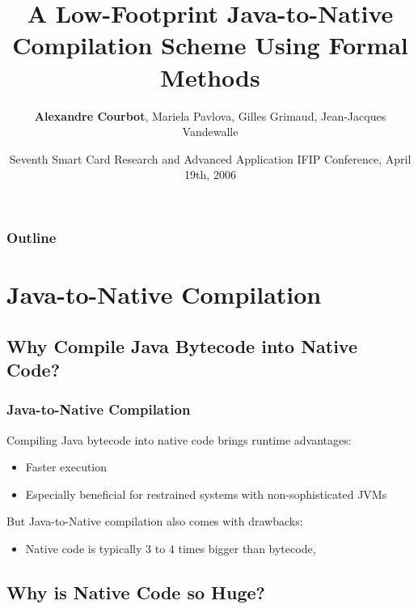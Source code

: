 \documentclass{beamer}
\title[CARDIS'06]{A Low-Footprint Java-to-Native Compilation Scheme Using Formal Methods}
\author[Alexandre.Courbot@lifl.fr]{\textbf{Alexandre Courbot}, Mariela Pavlova, Gilles Grimaud, Jean-Jacques Vandewalle}
\date[CARDIS'06]{Seventh Smart Card Research and Advanced Application IFIP Conference, April 19th, 2006}
\begin{document}
\begin{frame}
\titlepage
\end{frame}

\begin{frame}
\frametitle{Outline}
\tableofcontents
\end{frame}

\section{Java-to-Native Compilation}

\subsection{Why Compile Java Bytecode into Native Code?}

\begin{frame}
\frametitle{Java-to-Native Compilation}

Compiling Java bytecode into native code brings runtime advantages:
\begin{itemize}
\item Faster execution
\item Especially beneficial for restrained systems with non-sophisticated JVMs
\end{itemize}
But Java-to-Native compilation also comes with drawbacks:
\begin{itemize}
\item Native code is typically 3 to 4 times bigger than bytecode,
\end{itemize}
\end{frame}

\subsection{Why is Native Code so Huge?}
\end{document}
